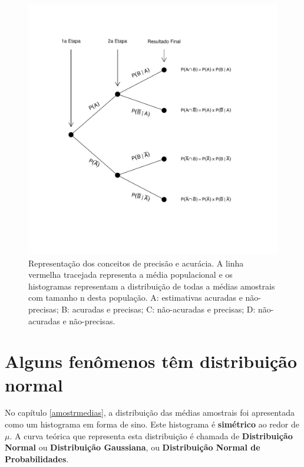 \documentclass[
]{book}
\begin{document}
\begin{figure}

{\centering \includegraphics[width=13.89in]{probest-cambientais_files/figure-latex/unnamed-chunk-184-1} 

}

\caption{Representação dos conceitos de precisão e acurácia. A linha vermelha tracejada representa a média populacional e os histogramas representam a distribuição de todas a médias amostrais com tamanho n desta população. A: estimativas acuradas e não-precisas; B: acuradas e precisas; C: não-acuradas e precisas; D: não-acuradas e não-precisas.}\label{fig:unnamed-chunk-184}
\end{figure}

\hypertarget{normdist}{%
\chapter{Alguns fenômenos têm distribuição normal}\label{normdist}}

No capítulo \ref{amostrmedias}, a distribuição das médias amostrais foi apresentada como um histograma em forma de sino. Este histograma é \textbf{simétrico} ao redor de \(\mu\). A curva teórica que representa esta distribuição é chamada de \textbf{Distribuição Normal} ou \textbf{Distribuição Gaussiana}, ou \textbf{Distribuição Normal de Probabilidades}.
\end{document}
